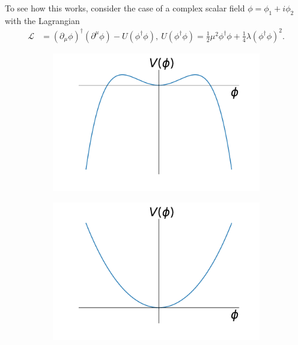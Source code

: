 To see how this works, consider the case of a complex scalar field $\phi =
\phi_1 + i\phi_2$ with the Lagrangian
\begin{align}
  \mathcal{L} &=
    (\partial_\mu\phi)^\dagger (\partial^\mu\phi)
    - U(\phi^\dagger\phi),\
  U(\phi^\dagger\phi) =
    \frac{1}{2}\mu^2\phi^\dagger\phi
    + \frac{1}{4}\lambda(\phi^\dagger\phi)^2.
  \label{eq:complex_lagrangian}
\end{align}
\begin{figure}[tb]
  \begin{subfigure}{0.33\textwidth}
    \centering
    \includegraphics[width=\textwidth]{figures/complex_scalar_neg_lambda}
    \caption{}
    \label{sfig:neg_lambda}
  \end{subfigure}%
  \begin{subfigure}{0.33\textwidth}
    \centering
    \includegraphics[width=\textwidth]{figures/complex_scalar_pos_mass}

\end{subfigure}
\end{figure}
